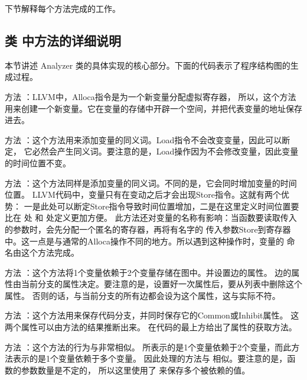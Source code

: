 下节解释每个方法完成的工作。

\subsection{类  中方法的详细说明}

本节讲述 Analyzer 类的具体实现的核心部分。下面的代码表示了程序结构图的生成过程。

{
    
}

方法 ：LLVM中，Alloca指令是为一个新变量分配虚拟寄存器，
所以，这个方法用来创建一个新变量。它在变量的存储中开辟一个空间，并把代表变量的地址保存进去。

方法 ：这个方法用来添加变量的同义词。Load指令不会改变变量，因此可以断定，
它必然会产生同义词。要注意的是，Load操作因为不会修改变量，因此变量的时间位置不变。

方法 ：这个方法同样是添加变量的同义词。不同的是，它会同时增加变量的时间位置。
LLVM代码中，变量只有在变动之后才会出现Store指令。这就有两个优势：
一是此处可以断定Store指令导致时间位置增加，二是在这里定义时间位置要比在  处
和  处定义更加方便。
此方法还对变量的名称有影响：当函数要读取传入的参数时，会先分配一个匿名的寄存器，再将有名字的
传入参数Store到寄存器中。这一点是与通常的Alloca操作不同的地方。所以遇到这种操作时，变量的
命名由这个方法完成。

方法 ：这个方法将1个变量依赖于2个变量存储在图中。并设置边的属性。
边的属性由当前分支的属性决定。要注意的是，设置好一次属性后，要从列表中删除这个属性。
否则的话，与当前分支的所有边都会设为这个属性，这与实际不符。

方法 ：这个方法用来保存代码分支，并同时保存它的Common或Inhibit属性。
这两个属性可以由方法的结果推断出来。
在代码的最上方给出了属性的获取方法。

方法 ：这个方法的行为与非常相似。
 所表示的是1个变量依赖于2个变量，而此方法表示的是1个变量依赖于多个变量。
因此处理的方法与  相似。要注意的是，函数的参数数量是不定的，
所以这里使用了  来保存多个被依赖的值。
